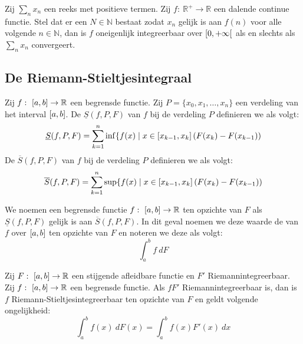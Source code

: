 \documentclass[main.tex]{subfiles}
\begin{document}
\begin{bst}
  Zij $\sum_{n}x_{n}$ een reeks met positieve termen.
  Zij $f:\ \mathbb{R}^{+}\rightarrow \mathbb{R}$ een dalende continue functie.
  Stel dat er een $N\in \mathbb{N}$ bestaat zodat $x_{n}$ gelijk is aan $f(n)$ voor alle volgende $n\in \mathbb{N}$, dan is $f$ oneigenlijk integreerbaar over $\interval[open right]{0}{+\infty}$ als en slechts als $\sum_{n}x_{n}$ convergeert.
\end{bst}


\subsection{De Riemann-Stieltjesintegraal}
\label{sec:de-riem-stieltj}

\begin{de}
  Zij $f:\ \interval{a}{b} \rightarrow \mathbb{R}$ een begrensde functie.
  Zij $P = \{x_{0},x_{1},\dotsc,x_{n}\}$ een verdeling van het interval $\interval{a}{b}$.
  De  $\underline{S}(f,P,F)$ van $f$ bij de verdeling $P$ definieren we als volgt:
\[ \underline{S}(f,P,F) = \sum_{k=1}^{n} \inf\{ f(x) \mid x\in \interval{x_{k-1}}{x_{k}} \left( F(x_{k}) - F(x_{k-1}) \right) \]
  De  $\overline{S}(f,P,F)$ van $f$ bij de verdeling $P$ definieren we als volgt:
\[ \overline{S}(f,P,F) = \sum_{k=1}^{n} \sup\{ f(x) \mid x\in \interval{x_{k-1}}{x_{k}} \left( F(x_{k}) - F(x_{k-1}) \right) \]
\end{de}

\begin{de}
  We noemen een begrensde functie $f:\ \interval{a}{b} \rightarrow \mathbb{R}$  ten opzichte van $F$ als $\underline{S}(f,P,F)$ gelijk is aan $\overline{S}(f,P,F)$.
  In dit geval noemen we deze waarde de  van $f$ over $\interval{a}{b}$ ten opzichte van $F$ en noteren we deze als volgt:
  \[ \int_{a}^{b}f\ dF \]
\end{de}

\begin{bst}
  Zij $F:\ \interval{a}{b}\rightarrow \mathbb{R}$ een stijgende afleidbare functie en $F'$ Riemannintegreerbaar.
  Zij $f:\ \interval{a}{b} \rightarrow \mathbb{R}$ een begrensde functie.
  Als $fF'$ Riemannintegreerbaar is, dan is $f$ Riemann-Stieltjesintegreerbaar ten opzichte van $F$ en geldt volgende ongelijkheid:
  \[ \int_{a}^{b}f(x)\ dF(x) = \int_{a}^{b}f(x)F'(x)\ dx \]
\end{bst}
\end{document}
